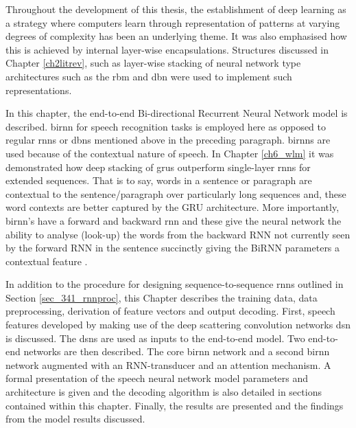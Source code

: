 \startblue
Throughout the development of this thesis, the establishment of deep learning as a strategy where computers learn through representation of patterns at varying degrees of complexity has been an underlying theme.  It was also emphasised how this is achieved by internal layer-wise encapsulations. Structures discussed in Chapter \ref{ch2litrev}, such as layer-wise stacking of neural network type architectures such as the \acrfull{rbm} and \acrfull{dbn} were used to implement such representations.  

In this chapter, the end-to-end Bi-directional Recurrent Neural Network model is described.  \acrshort{birnn} for speech recognition tasks is  employed here as opposed to regular \acrshort{rnn}s or \acrshort{dbn}s mentioned above in the preceding paragraph.  \acrshort{birnn}s are used because of the contextual nature of speech.  In Chapter \ref{ch6_wlm} it was demonstrated  how deep stacking of \acrshort{gru}s outperform single-layer \acrshort{rnn}s for extended sequences. That is to say, words in a sentence or paragraph are contextual to the sentence/paragraph over particularly long sequences and, these word contexts are better captured by the GRU architecture.  More importantly, \acrshort{birnn}'s have a forward and backward \acrshort{rnn} and these give the neural network the ability to analyse (look-up) the words from the backward RNN not currently seen by the forward RNN in the sentence succinctly giving the BiRNN parameters a contextual feature \citep{graves2006connectionist}.  

In addition to the procedure for designing sequence-to-sequence \acrshort{rnn}s outlined in Section \ref{sec_341_rnnproc}, this Chapter describes the training data, data preprocessing, derivation of feature vectors and output decoding.  First, speech features developed by making use of the deep scattering convolution networks \acrshort{dsn} is discussed.   The \acrshort{dsn}s are used as inputs to the end-to-end model.  Two end-to-end networks are then described.  The core \acrshort{birnn} network and a second \acrshort{birnn} network augmented with an RNN-transducer and an attention mechanism. A formal presentation of the speech neural network model parameters and architecture is given and the decoding algorithm is also detailed in sections contained within this chapter.  Finally, the results are presented and the findings from the model results discussed.\stopblue

